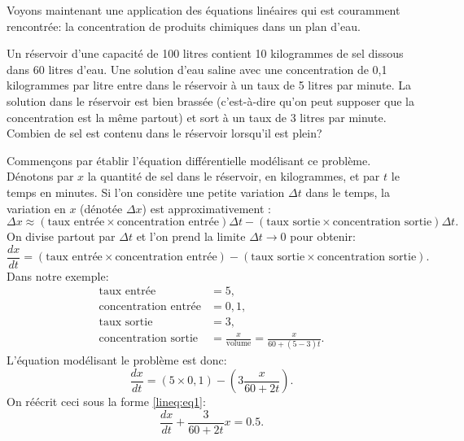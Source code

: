 \begin{example}
	Voyons maintenant une application des équations linéaires qui est couramment rencontrée: la concentration de produits chimiques dans un plan d'eau.

	\begin{mywrapfigsimp}{1.60in}{1.65in}
	\noindent
	\end{mywrapfigsimp}
	Un réservoir d'une capacité de 100 litres contient 10 kilogrammes de sel dissous dans 60 litres d'eau.  Une solution d'eau saline avec une concentration de 0,1 kilogrammes par litre entre dans le réservoir à un taux de 5 litres par minute. La solution dans le réservoir est bien brassée (c'est-à-dire qu'on peut supposer que la concentration est la même partout) et sort à un taux de 3 litres par minute.  Combien de sel est contenu dans le réservoir lorsqu'il est plein?

	Commençons par établir l'équation différentielle modélisant ce problème.  Dénotons par $x$ la quantité de sel dans le réservoir, en kilogrammes,  et par $t$ le temps en minutes.  Si l'on considère une petite variation $\Delta t$ dans le temps, la variation en $x$ (dénotée $\Delta x$) est approximativement :
	\begin{equation*}
		\Delta x \approx
		(\text{taux entrée} \times \text{concentration entrée}) \Delta t -
		(\text{taux sortie} \times \text{concentration sortie}) \Delta t .
	\end{equation*}
	On divise partout par $\Delta t$ et l'on prend la limite $\Delta t \to 0$ pour obtenir:
	\begin{equation*}
		\frac{dx}{dt} =
		(\text{taux entrée} \times \text{concentration entrée})  -
		(\text{taux sortie} \times \text{concentration sortie}) .
	\end{equation*}
	Dans notre exemple:
	\begin{align*}
		\text{taux entrée} &= 5 , \\
		\text{concentration entrée} &= 0,1 , \\
		\text{taux sortie} &= 3 , \\
		\text{concentration sortie} &= \frac{x}{\text{volume}} = \frac{x}{60+(5-3)t} .
	\end{align*}
	L'équation modélisant le problème est donc:
	\begin{equation*}
		\frac{dx}{dt} =	(5 \times 0,1)  - 	\left(3 \frac{x}{60+2t}\right) .
	\end{equation*}
	On réécrit ceci sous la forme \eqref{lineq:eq1}:
	\begin{equation*}
		\frac{dx}{dt} + 	\frac{3}{60+2t} x = 	0.5 .
	\end{equation*}


\end{example}
